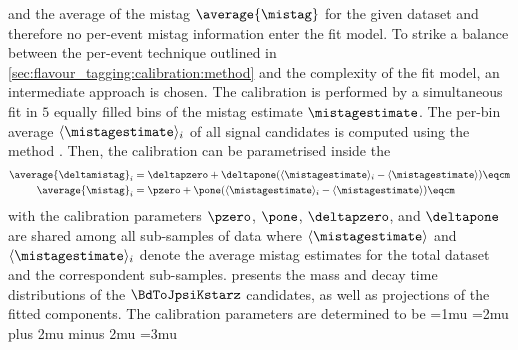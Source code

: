 and the average of the mistag $\average{\mistag}$ for the given dataset and
therefore no per-event mistag information enter the fit model. To strike a
balance between the per-event technique outlined in
\cref{sec:flavour_tagging:calibration:method} and the complexity of the fit model,
an intermediate approach is chosen. The calibration is performed by a
simultaneous fit in $\num{5}$ equally filled bins of the mistag estimate
$\mistagestimate$. The per-bin average $\langle\mistagestimate\rangle_i$ of all
signal candidates is computed using the \splot method \cite{Pivk:2004ty}. Then,
the calibration can be parametrised inside the \PDF
%
\begin{equation}
  \begin{split}
    \average{\deltamistag}_i  &= \deltapzero + \deltapone ( \langle\mistagestimate\rangle_i - \langle\mistagestimate\rangle )\eqcm \\
    \average{\mistag}_i       &= \pzero + \pone ( \langle\mistagestimate\rangle_i - \langle\mistagestimate\rangle )\eqcm
  \end{split}
\end{equation}
%
with the calibration parameters $\pzero$, $\pone$, $\deltapzero$, and
$\deltapone$ are shared among all sub-samples of data where
$\langle\mistagestimate\rangle$ and $\langle\mistagestimate\rangle_i$ denote the
average mistag estimates for the total dataset and the correspondent
sub-samples.  presents the mass and
decay time distributions of the $\BdToJpsiKstarz$ candidates, as well as
projections of the fitted \PDF components. The calibration parameters are
determined to be
%
\begingroup
  \thinmuskip=1mu
  \medmuskip=2mu plus 2mu minus 2mu
  \thickmuskip=3mu
